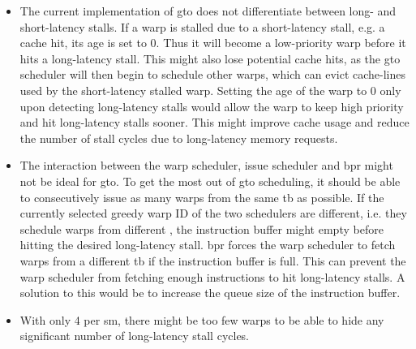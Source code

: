 \begin{itemize}
    \item The current implementation of \acrshort{gto} does not differentiate between long- and short-latency stalls. If a warp is stalled due to a short-latency stall, e.g. a cache hit, its age is set to 0. Thus it will become a low-priority warp before it hits a long-latency stall. This might also lose potential cache hits, as the \acrshort{gto} scheduler will then begin to schedule other warps, which can evict cache-lines used by the short-latency stalled warp. Setting the age of the warp to 0 only upon detecting long-latency stalls would allow the warp to keep high priority and hit long-latency stalls sooner. This might improve cache usage and reduce the number of stall cycles due to long-latency memory requests. 
    \item The interaction between the warp scheduler, issue scheduler and \acrshort{bpr} might not be ideal for \acrshort{gto}. To get the most out of \acrshort{gto} scheduling, it should be able to consecutively issue as many warps from the same \acrshort{tb} as possible. If the currently selected greedy warp ID of the two schedulers are different, i.e. they schedule warps from different , the instruction buffer might empty before hitting the desired long-latency stall. \acrshort{bpr} forces the warp scheduler to fetch warps from a different \acrshort{tb} if the instruction buffer is full. This can prevent the warp scheduler from fetching enough instructions to hit long-latency stalls. A solution to this would be to increase the queue size of the instruction buffer.  
    \item With only 4  per \acrshort{sm}, there might be too few warps to be able to hide any significant number of long-latency stall cycles.
\end{itemize}




